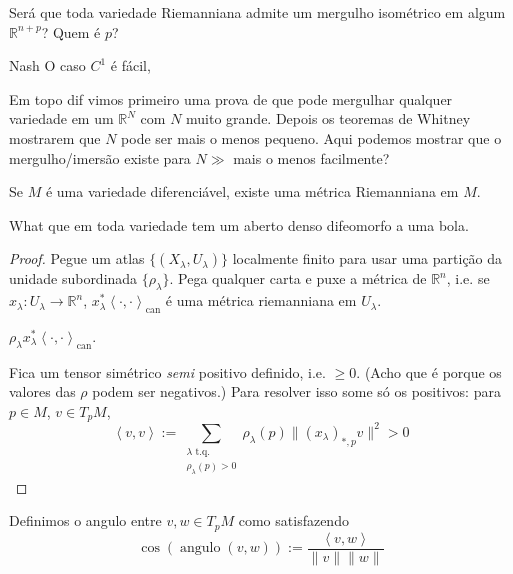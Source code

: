 \begin{question}\leavevmode
Será que toda variedade Riemanniana admite um mergulho isométrico em algum \(\mathbb{R}^{n+p}\)? Quem é \(p\)?
\end{question}

\begin{thing7}{Nash}\leavevmode
O caso \(C^1\) é fácil, 
\end{thing7}

\begin{question}[dani]\leavevmode
Em topo dif vimos primeiro uma prova de que pode mergulhar qualquer variedade em um \(\mathbb{R}^N\) com \(N\) muito grande. Depois os teoremas de Whitney mostrarem que \(N\) pode ser mais o menos pequeno. Aqui podemos mostrar que o mergulho/imersão existe para \(N\gg\) mais o menos facilmente?
\end{question}

\begin{prop}\leavevmode
Se \(M\) é uma variedade diferenciável, existe uma métrica Riemanniana em \(M\).
\end{prop}

\begin{thing6}{What}\leavevmode
que em toda variedade tem um aberto denso difeomorfo a uma bola.
\end{thing6}

\begin{proof}\leavevmode
Pegue um atlas \(\{(X_\lambda,U_\lambda)\}\) localmente finito para usar uma partição da unidade subordinada  \(\{\rho_\lambda\}\). Pega qualquer carta e puxe a métrica de \(\mathbb{R}^n\), i.e. se \(x_\lambda:U_\lambda \longrightarrow \mathbb{R}^n\), \(x^* _\lambda \left<\cdot,\cdot\right>_{\operatorname{can}}\) é uma métrica riemanniana em \(U_\lambda\).

\(\rho_\lambda x^* _\lambda \left<\cdot,\cdot\right>_{\operatorname{can}}\). 

Fica um tensor simétrico \textit{semi} positivo definido, i.e. \(\geq 0\). {\color{6}(Acho que é porque os valores das \(\rho\) podem ser negativos.)} Para resolver isso some só os positivos: para \(p \in M\), \(v \in T_pM\),
\[\left<v,v\right>:=\sum_{\substack{\lambda \text{ t.q.} \\  \rho_\lambda(p)>0}}\rho_\lambda(p)\|(x_\lambda)_{*,p}v\|^2>0\]
\end{proof}

Definimos o angulo entre \(v,w \in T_pM\) como satisfazendo
\[\cos (\operatorname{a n g u l o}(v,w)):=\frac{\left<v,w\right>}{\|v\|\|w\|}\]

